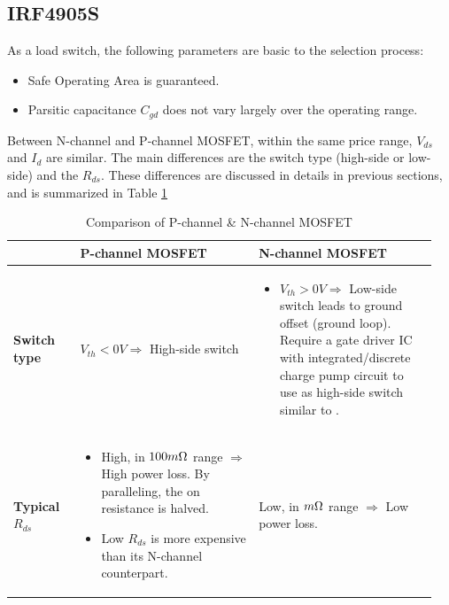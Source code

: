 \documentclass[../main.tex]{subfiles}
\begin{document}
    \pagebreak
    \subsection{IRF4905S} \label{ssec:irf4905}

    \justify
    As a load switch, the following parameters are basic to the selection process:
    \begin{itemize}
        \item Safe Operating Area is guaranteed.
        \item Parsitic capacitance $C_{gd}$ does not vary largely over the operating range.
    \end{itemize}

    \justify
    Between N-channel and P-channel MOSFET, within the same price range, $V_{ds}$ and $I_d$ are similar. The main differences are the switch type (high-side or low-side) and the $R_{ds}$. These differences are discussed in details in previous sections, and is summarized in Table \ref{table:MOSFET_channel_type}
    

    \begin{table}[!h]
        \centering
        \begin{tabular}{|m{0.15\linewidth}|m{0.4\linewidth}|m{0.4\linewidth}|}
        
        \hline
        & \textbf{P-channel MOSFET} &  \textbf{N-channel MOSFET} \\
        \hline
        \textbf{Switch type} & $V_{th} < 0V \Rightarrow$ High-side switch & 
        \begin{itemize}
            \item $V_{th} > 0V \Rightarrow $ Low-side switch leads to ground offset (ground loop). Require a gate driver IC with integrated/discrete charge pump circuit to use as high-side switch similar to \cite{InfineonNMOSHighDrive}.
        \end{itemize}
        \\
        \hline
        \textbf{Typical $R_{ds}$} & 
        \begin{itemize}
            \item High, in $100 m\ohm$ range $\Rightarrow$ High power loss. By paralleling, the on resistance is halved.
            \item Low $R_{ds}$ is more expensive than its N-channel counterpart.
        \end{itemize}
         
        & Low, in $m\ohm$ range $\Rightarrow$ Low power loss.
        \\
        
        \hline
        \end{tabular}
        \caption{Comparison of P-channel \& N-channel MOSFET}
        \label{table:MOSFET_channel_type}

    \end{table}    
\end{document}
